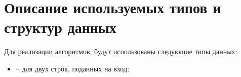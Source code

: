 \section{Описание используемых типов и структур данных}

Для реализации алгоритмов, будут использованы следующие типы данных:
\begin{itemize}
	\item  -- для двух строк, поданных на вход;
\end{itemize}